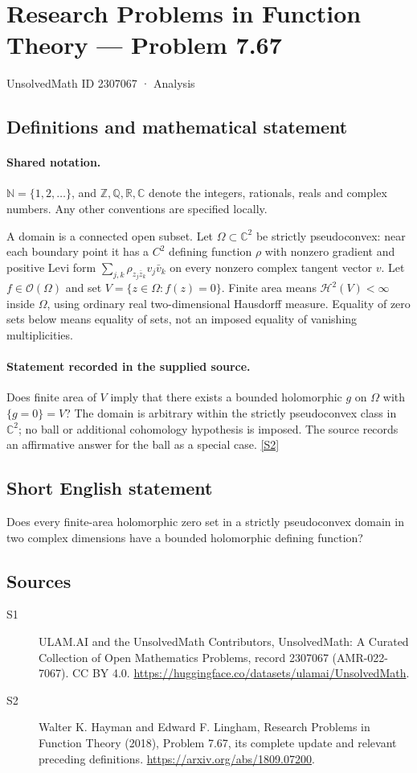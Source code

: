 \documentclass[11pt]{article}
\newcommand{\sref}[2]{\hyperlink{source:#1:#2}{[S#2]}}
\begin{document}
\setcounter{section}{2307066}
\section{Research Problems in Function Theory — Problem 7.67}\label{2307067}
{\small\sffamily UnsolvedMath ID 2307067 · Analysis}
\subsection{Definitions and mathematical statement}

\paragraph{Shared notation.}$\mathbb N=\{1,2,\ldots\}$, and $\mathbb Z,\mathbb Q,\mathbb R,\mathbb C$ denote the integers, rationals, reals and complex numbers. Any other conventions are specified locally.


A domain is a connected open subset. Let $\Omega\subset\mathbb C^2$ be strictly pseudoconvex: near each boundary point it has a $C^2$ defining function $\rho$ with nonzero gradient and positive Levi form $\sum_{j,k}\rho_{z_j\bar z_k}v_j\bar v_k$ on every nonzero complex tangent vector $v$. Let $f\in\mathcal O(\Omega)$ and set $V=\{z\in\Omega:f(z)=0\}$. Finite area means $\mathcal H^2(V)<\infty$ inside $\Omega$, using ordinary real two-dimensional Hausdorff measure. Equality of zero sets below means equality of sets, not an imposed equality of vanishing multiplicities.
\paragraph{Statement recorded in the supplied source.}
Does finite area of $V$ imply that there exists a bounded holomorphic $g$ on $\Omega$ with $\{g=0\}=V$? The domain is arbitrary within the strictly pseudoconvex class in $\mathbb C^2$; no ball or additional cohomology hypothesis is imposed. The source records an affirmative answer for the ball as a special case. \sref{2307067}{2}
\subsection{Short English statement}
Does every finite-area holomorphic zero set in a strictly pseudoconvex domain in two complex dimensions have a bounded holomorphic defining function?
\subsection{Sources}
\begin{description}
\item[\hypertarget{source:2307067:1}{S1}] ULAM.AI and the UnsolvedMath Contributors, UnsolvedMath: A Curated Collection of Open Mathematics Problems, record 2307067 (AMR-022-7067). CC BY 4.0. \url{https://huggingface.co/datasets/ulamai/UnsolvedMath}.
\item[\hypertarget{source:2307067:2}{S2}] Walter K. Hayman and Edward F. Lingham, Research Problems in Function Theory (2018), Problem 7.67, its complete update and relevant preceding definitions. \url{https://arxiv.org/abs/1809.07200}.
\end{description}
\label{end:2307067}
\end{document}
